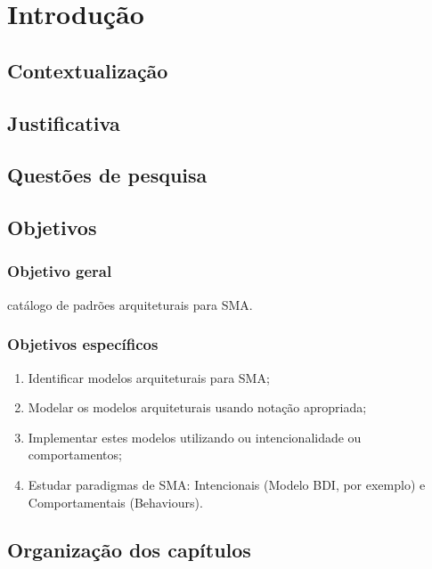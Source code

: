 \chapter[Introdução]{Introdução}

\section{Contextualização}

\section{Justificativa}

\section{Questões de pesquisa}

\section{Objetivos}

\subsection{Objetivo geral}

catálogo de padrões
arquiteturais para SMA.

\subsection{Objetivos específicos}

\begin{enumerate}
    \item Identificar modelos arquiteturais para SMA;
    \item Modelar os modelos arquiteturais usando notação apropriada;
    \item Implementar estes modelos utilizando ou intencionalidade ou comportamentos;
    \item Estudar paradigmas de SMA: Intencionais (Modelo BDI, por exemplo) e Comportamentais (Behaviours). 
\end{enumerate}

\section{Organização dos capítulos}
    






